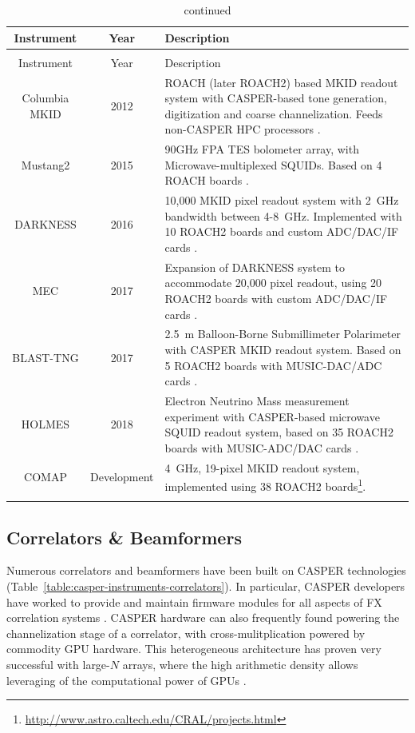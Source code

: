 \documentclass{ws-jai}
\begin{document}
\begin{longtable}{ccp{10cm}}
  \caption{MKID readout systems powered by CASPER hardware.}\\
  Instrument & Year & Description \\
  \hline \endfirsthead
  \caption[]{continued}\\
  Instrument & Year & Description \\
  \hline \endhead
  Columbia MKID    & 2012 & ROACH (later ROACH2) based MKID readout system with CASPER-based tone generation, digitization and coarse channelization. Feeds non-CASPER HPC processors \citep{mccarrick_2014}. \\
  Mustang2         & 2015 & 90GHz FPA TES bolometer array, with Microwave-multiplexed SQUIDs. Based on 4 ROACH boards \citep{2016JLTP..184..460S, 2014JLTP..176..808D}.  \\
  DARKNESS         & 2016 & 10,000 MKID pixel readout system with 2~GHz bandwidth between 4-8~GHz. Implemented with 10 ROACH2 boards and custom ADC/DAC/IF cards \citep{meeker2015design}. \\
  MEC              & 2017 & Expansion of DARKNESS system to accommodate 20,000 pixel readout, using 20 ROACH2 boards with custom ADC/DAC/IF cards \citep{meeker2015design}. \\
  BLAST-TNG        & 2017 &  2.5~m Balloon-Borne Submillimeter Polarimeter with CASPER MKID readout system. Based on 5 ROACH2 boards with MUSIC-DAC/ADC cards \citep{galitzki2014balloon}. \\
  HOLMES           & 2018 & Electron Neutrino Mass measurement experiment with CASPER-based microwave SQUID readout system, based on 35 ROACH2 boards with MUSIC-ADC/DAC cards \citep{Alpert2015, Ferri2016179}. \\
  COMAP            & Development & 4~GHz, 19-pixel MKID readout system, implemented using 38 ROACH2 boards\footnote{\url{http://www.astro.caltech.edu/CRAL/projects.html}}. \\
  \label{table:casper-instruments-mkids}
\end{longtable}


\subsection{Correlators \& Beamformers}

Numerous correlators and beamformers have been built on CASPER technologies (Table~\ref{table:casper-instruments-correlators}). In particular, CASPER developers have worked to provide and maintain firmware modules for all aspects of FX correlation systems \citep{parsons2008scalable}. CASPER hardware can also frequently found powering the channelization stage of a correlator, with cross-mulitplication powered by commodity GPU hardware. This heterogeneous architecture has proven very successful with large-$N$ arrays, where the high arithmetic density allows leveraging of the computational power of GPUs \citep{scalable-gpu-fpga, chime-correlator}.
\end{document}
